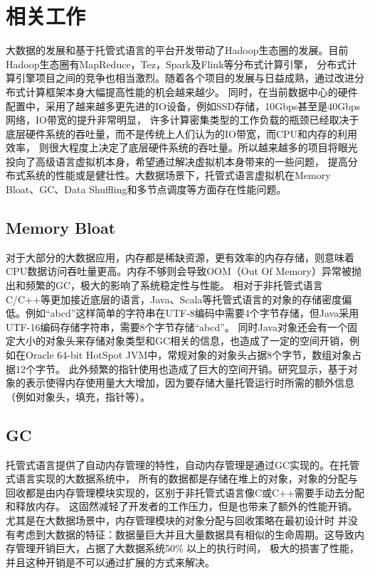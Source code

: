 
\chapter{相关工作}
大数据的发展和基于托管式语言的平台开发带动了Hadoop生态圈的发展。目前Hadoop生态圈有MapReduce，Tez，Spark及Flink等分布式计算引擎，
分布式计算引擎项目之间的竞争也相当激烈。随着各个项目的发展与日益成熟，通过改进分布式计算框架本身大幅提高性能的机会越来越少。
同时，在当前数据中心的硬件配置中，采用了越来越多更先进的IO设备，例如SSD存储，10Gbps甚至是40Gbps网络，IO带宽的提升非常明显，
许多计算密集类型的工作负载的瓶颈已经取决于底层硬件系统的吞吐量，而不是传统上人们认为的IO带宽，而CPU和内存的利用效率，
则很大程度上决定了底层硬件系统的吞吐量。所以越来越多的项目将眼光投向了高级语言虚拟机本身，希望通过解决虚拟机本身带来的一些问题，
提高分布式系统的性能或是健壮性。大数据场景下，托管式语言虚拟机在Memory Bloat、GC、Data Shuffling和多节点调度等方面存在性能问题。

\section{Memory Bloat}
对于大部分的大数据应用，内存都是稀缺资源，更有效率的内存存储，则意味着CPU数据访问吞吐量更高。内存不够则会导致OOM（Out Of Memory）异常被抛出和频繁的GC，极大的影响了系统稳定性与性能。
相对于非托管式语言C/C++等更加接近底层的语言，Java、Scala等托管式语言的对象的存储密度偏低。例如“abcd”这样简单的字符串在UTF-8编码中需要4个字节存储，但Java采用UTF-16编码存储字符串，需要8个字节存储“abcd”\cite{xin2015project,rosendeep}。
同时Java对象还会有一个固定大小的对象头来存储对象类型和GC相关的信息，也造成了一定的空间开销，例如在Oracle 64-bit HotSpot JVM中，常规对象的对象头占据8个字节，数组对象占据12个字节\cite{nguyen2019compiler}。
此外频繁的指针使用也造成了巨大的空间开销。研究显示\cite{bu2013bloat, mitchell2007causes}，基于对象的表示使得内存使用量大大增加，因为要存储大量托管运行时所需的额外信息（例如对象头，填充，指针等）。

\section{GC}
托管式语言提供了自动内存管理的特性，自动内存管理是通过GC实现的。在托管式语言实现的大数据系统中，
所有的数据都是存储在堆上的对象，对象的分配与回收都是由内存管理模块实现的，区别于非托管式语言像C或C++需要手动去分配和释放内存。
这固然减轻了开发者的工作压力，但是也带来了额外的性能开销。尤其是在大数据场景中，内存管理模块的对象分配与回收策略在最初设计时
并没有考虑到大数据的特征：数据量巨大并且大量数据具有相似的生命周期。这导致内存管理开销巨大，占据了大数据系统50\% 以上的执行时间，
极大的损害了性能，并且这种开销是不可以通过扩展的方式来解决。

